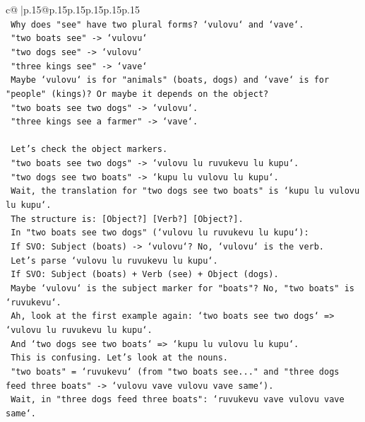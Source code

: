 \documentclass{article}
\begin{document}
{\begin{supertabular}{c@{$\;$}|p{.15\linewidth}@{}p{.15\linewidth}p{.15\linewidth}p{.15\linewidth}p{.15\linewidth}p{.15\linewidth}}
{{{\\ 
\texttt{   Why does "see" have two plural forms? `vulovu` and `vave`.} \\
\texttt{   "two boats see" {-}> `vulovu`} \\
\texttt{   "two dogs see" {-}> `vulovu`} \\
\texttt{   "three kings see" {-}> `vave`} \\
\texttt{   Maybe `vulovu` is for "animals" (boats, dogs) and `vave` is for "people" (kings)? Or maybe it depends on the object?} \\
\texttt{   "two boats see two dogs" {-}> `vulovu`.} \\
\texttt{   "three kings see a farmer" {-}> `vave`.} \\
\\ 
\texttt{   Let's check the object markers.} \\
\texttt{   "two boats see two dogs" {-}> `vulovu lu ruvukevu lu kupu`.} \\
\texttt{   "two dogs see two boats" {-}> `kupu lu vulovu lu kupu`.} \\
\texttt{   Wait, the translation for "two dogs see two boats" is `kupu lu vulovu lu kupu`.} \\
\texttt{   The structure is: {[}Object?{]} {[}Verb?{]} {[}Object?{]}.} \\
\texttt{   In "two boats see two dogs" (`vulovu lu ruvukevu lu kupu`):} \\
\texttt{   If SVO: Subject (boats) {-}> `vulovu`? No, `vulovu` is the verb.} \\
\texttt{   Let's parse `vulovu lu ruvukevu lu kupu`.} \\
\texttt{   If SVO: Subject (boats) + Verb (see) + Object (dogs).} \\
\texttt{   Maybe `vulovu` is the subject marker for "boats"? No, "two boats" is `ruvukevu`.} \\
\texttt{   Ah, look at the first example again: `two boats see two dogs` => `vulovu lu ruvukevu lu kupu`.} \\
\texttt{   And `two dogs see two boats` => `kupu lu vulovu lu kupu`.} \\
\texttt{   This is confusing. Let's look at the nouns.} \\
\texttt{   "two boats" = `ruvukevu` (from "two boats see..." and "three dogs feed three boats" {-}> `vulovu vave vulovu vave same`).} \\
\texttt{   Wait, in "three dogs feed three boats": `ruvukevu vave vulovu vave same`.} \\
}}}
\end{supertabular}}
\end{document}
